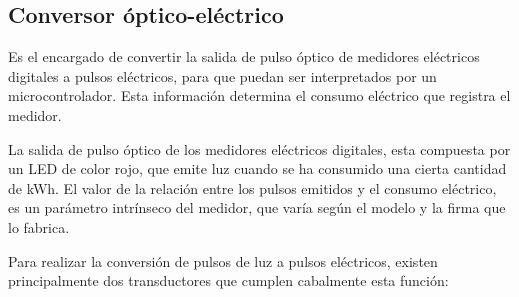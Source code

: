 \subsection{Conversor óptico-eléctrico}

Es el encargado de convertir la salida de pulso óptico de medidores eléctricos digitales a pulsos eléctricos, para que puedan ser interpretados por un microcontrolador. Esta información determina el consumo eléctrico que registra el medidor.

La salida de pulso óptico de los medidores eléctricos digitales, esta compuesta por un LED de color rojo, que emite luz cuando se ha consumido una cierta cantidad de kWh. El valor de la relación entre los pulsos emitidos y el consumo eléctrico, es un parámetro intrínseco del medidor, que varía según el modelo y la firma que lo fabrica.

Para realizar la conversión de pulsos de luz a pulsos eléctricos, existen principalmente dos transductores que cumplen cabalmente esta función:

